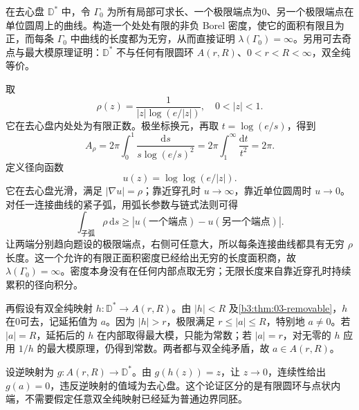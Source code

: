 \begin{exercise}\label{b3:ex:08-6}
在去心盘 \(\mathbb D^*\) 中，令 \(\Gamma_0\) 为所有局部可求长、一个极限端点为0、另一个极限端点在单位圆周上的曲线。构造一个处处有限的非负 Borel 密度，使它的面积有限且为正，而每条 \(\Gamma_0\) 中曲线的长度都为无穷，从而直接证明 \(\lambda(\Gamma_0)=\infty\)。另用可去奇点与最大模原理证明：\(\mathbb D^*\) 不与任何有限圆环 \(A(r,R)\)、\(0<r<R<\infty\)，双全纯等价。
\end{exercise}
\begin{solution}
取
\[
 \rho(z)=\frac1{|z|\log(e/|z|)},\quad0<|z|<1.
\]
它在去心盘内处处为有限正数。极坐标换元，再取 \(t=\log(e/s)\)，得到
\[
 A_\rho=2\pi\int_0^1
 \frac{\mathrm{d}s}{s\log(e/s)^2}
 =2\pi\int_1^\infty\frac{\mathrm{d}t}{t^2}=2\pi.
\]
定义径向函数
\[
 u(z)=\log\log(e/|z|).
\]
它在去心盘光滑，满足 \(|\nabla u|=\rho\)；靠近穿孔时 \(u\to\infty\)，靠近单位圆周时 \(u\to0\)。对任一连接曲线的紧子弧，用弧长参数与链式法则可得
\[
 \int_{\text{子弧}}\rho\,\mathrm{d}s
 \ge|u(\text{一个端点})-u(\text{另一个端点})|.
\]
让两端分别趋向题设的极限端点，右侧可任意大，所以每条连接曲线都具有无穷 \(\rho\) 长度。这一个允许的有限正面积密度已经给出无穷的长度面积商，故 \(\lambda(\Gamma_0)=\infty\)。密度本身没有在任何内部点取无穷；无限长度来自靠近穿孔时持续累积的径向积分。

再假设有双全纯映射 \(h:\mathbb D^*\to A(r,R)\)。由 \(|h|<R\) 及\cref{b3:thm:03-removable}，\(h\) 在0可去，记延拓值为 \(a\)。因为 \(|h|>r\)，极限满足 \(r\le|a|\le R\)，特别地 \(a\ne0\)。若 \(|a|=R\)，延拓后的 \(h\) 在内部取得最大模，只能为常数；若 \(|a|=r\)，对无零的 \(h\) 应用 \(1/h\) 的最大模原理，仍得到常数。两者都与双全纯矛盾，故 \(a\in A(r,R)\)。

设逆映射为 \(g:A(r,R)\to\mathbb D^*\)。由 \(g(h(z))=z\)，让 \(z\to0\)，连续性给出 \(g(a)=0\)，违反逆映射的值域为去心盘。这个论证区分的是有限圆环与点状内端，不需要假定任意双全纯映射已经延为普通边界同胚。
\end{solution}

